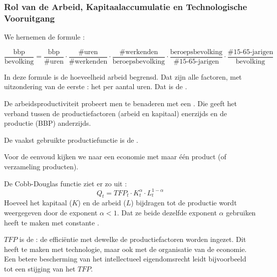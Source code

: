 \subsubsection{Rol van de Arbeid, Kapitaalaccumulatie en Technologische Vooruitgang}

We hernemen de formule :

$$\frac{\text{bbp}}{\text{bevolking}}=\frac{\text{bbp}}{\text{\#uren}}\cdot\frac{\text{\#uren}}{\text{\#werkenden}}\cdot\frac{\text{\#werkenden}}{\text{beroepsbevolking}}\cdot\frac{\text{beroepsbevolking}}{\text{\#15-65-jarigen}}\cdot\frac{\text{\#15-65-jarigen}}{\text{bevolking}}$$

In deze formule is de hoeveelheid arbeid begrensd. Dat zijn alle factoren, met uitzondering van de eerste : het  per aantal uren. Dat is de . \\

\par De arbeidsproductiviteit probeert men te benaderen met een . Die geeft het verband tussen de productiefactoren (arbeid en kapitaal) enerzijds en de productie (BBP) anderzijds.
\par De vaakst gebruikte productiefunctie is de . \\

\par\noindent Voor de eenvoud kijken we naar een economie met maar \'e\'en product (of verzameling producten). 
\par De Cobb-Douglas functie ziet er zo uit :
$$Q_t = TFP_t\cdot K_t^{\alpha}\cdot L_t^{1-\alpha}$$
Hoeveel het kapitaal ($K$) en de arbeid ($L$) bijdragen tot de productie wordt weergegeven door de exponent $\alpha < 1$. Dat ze beide dezelfde exponent $\alpha$ gebruiken heeft te maken met constante .
\par $TFP$ is de  : de effici\"entie met dewelke de productiefactoren worden ingezet. Dit heeft te maken met technologie, maar ook met de organisatie van de economie. Een betere bescherming van het intellectueel eigendomsrecht leidt bijvoorbeeld tot een stijging van het $TFP$. \\

